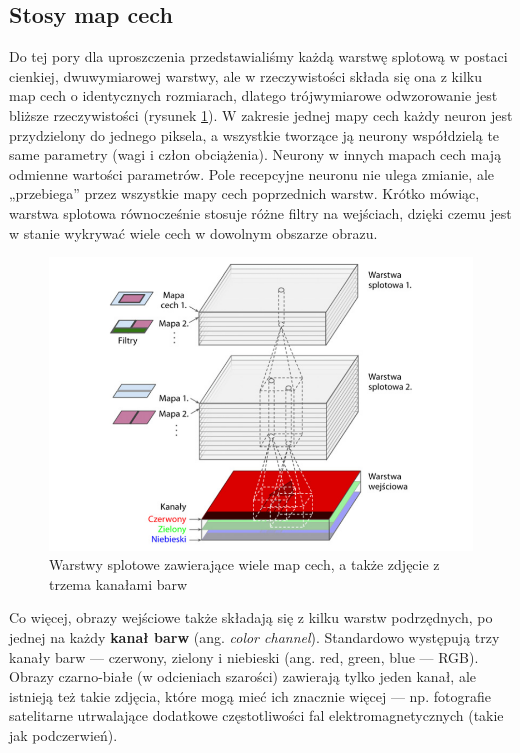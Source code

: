 \documentclass[12pt]{mwbk}
\theoremstyle{plain}
\theoremstyle{definition}
\theoremstyle{remark}
\newcommand\zrodlo[1]{\par\vspace{-3mm}{\small\textit{Źródło: }#1 }}
\begin{document}
\subsection{Stosy map cech}

Do tej pory dla uproszczenia przedstawialiśmy każdą warstwę splotową w postaci cienkiej, dwuwymiarowej warstwy, ale w rzeczywistości składa się ona z kilku map cech o identycznych rozmiarach, dlatego trójwymiarowe odwzorowanie jest bliższe rzeczywistości (rysunek \ref{fig:warstwy-kanaly}). W zakresie jednej mapy cech każdy neuron jest przydzielony do jednego piksela, a wszystkie tworzące ją neurony współdzielą te same parametry (wagi i człon obciążenia). Neurony w innych mapach cech mają odmienne wartości parametrów. Pole recepcyjne neuronu nie ulega zmianie, ale „przebiega” przez
wszystkie mapy cech poprzednich warstw. Krótko mówiąc, warstwa splotowa równocześnie stosuje
różne filtry na wejściach, dzięki czemu jest w stanie wykrywać wiele cech w dowolnym obszarze obrazu.

\begin{figure}[!h]
	\centering
	\includegraphics[width=\linewidth]{rys/warstwy_cnn_kanaly.png}
	\caption{Warstwy splotowe zawierające wiele map cech, a także zdjęcie z trzema kanałami barw}
	\zrodlo{\cite{geron}}
	\label{fig:warstwy-kanaly}
\end{figure}

Co więcej, obrazy wejściowe także składają się z kilku warstw podrzędnych, po jednej na każdy \textbf{kanał
barw} (ang. \emph{color channel}). Standardowo występują trzy kanały barw — czerwony, zielony i niebieski
(ang. red, green, blue — RGB). Obrazy czarno-białe (w odcieniach szarości) zawierają tylko jeden
kanał, ale istnieją też takie zdjęcia, które mogą mieć ich znacznie więcej — np. fotografie satelitarne
utrwalające dodatkowe częstotliwości fal elektromagnetycznych (takie jak podczerwień).
\end{document}
